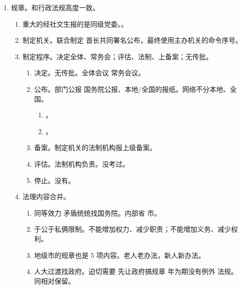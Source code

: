 \begin{enumerate}
\begin{enumerate}
        \end{enumerate}
  \item 规章。和行政法规高度一致。
        \begin{enumerate}
          \item 重大的经社文生报的是同级党委。。
          \item 制定机关。联合制定 \yjt 首长共同署名公布，最终使用主办机关的命令序号。
          \item 制定程序。决定全体、常务会；评估、法制、上备案；无传批。
                \begin{enumerate}
                  \item 决定。无传批。全体会议 \hz 常务会议。
                  \item 公布。部门公报 \hz 国务院公报、本地/全国的报纸。网络不分本地、全国。
                        \begin{enumerate}
                          \item {}。
                          \item {}。
                        \end{enumerate}
                  \item 备案。制定机关的法制机构报上级备案。
                  \item 评估。法制机构负责。没考过。
                  \item 停止。没有。
                \end{enumerate}
          \item 法理内容合并。
                \begin{enumerate}
                  \item 同等效力 \yjt 矛盾统统找国务院。内部省 \dy 市。
                  \item 于公于私俩限制。不能增加权力、减少职责；不能增加义务、减少权利。
                  \item 地级市的规章也是 5 项内容。老人老办法，新人新办法。
                  \item 人大过渡找政府。迫切需要 \yjt 先让政府搞规章  年为期没有例外 \yjt 法规。同相对保留。
                \end{enumerate}
        \end{enumerate}
\end{enumerate}
